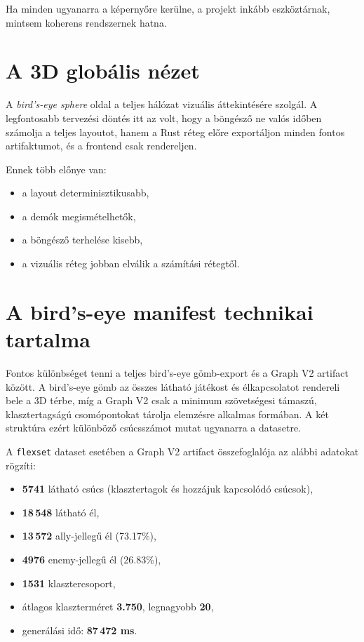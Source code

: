 ﻿\documentclass[a4paper,12pt]{report}
\begin{document}
Ha minden ugyanarra a képernyőre kerülne, a projekt inkább eszköztárnak, mintsem koherens rendszernek hatna.

\section{A 3D globális nézet}

A \emph{bird's-eye sphere} oldal a teljes hálózat vizuális áttekintésére szolgál. A legfontosabb tervezési döntés itt az volt, hogy a böngésző ne valós időben számolja a teljes layoutot, hanem a Rust réteg előre exportáljon minden fontos artifaktumot, és a frontend csak rendereljen.

Ennek több előnye van:

\begin{itemize}
    \item a layout determinisztikusabb,
    \item a demók megismételhetők,
    \item a böngésző terhelése kisebb,
    \item a vizuális réteg jobban elválik a számítási rétegtől.
\end{itemize}

\section{A bird's-eye manifest technikai tartalma}

Fontos különbséget tenni a teljes bird's-eye gömb-export és a Graph V2 artifact között. A bird's-eye gömb az összes látható játékost és élkapcsolatot rendereli bele a 3D térbe, míg a Graph V2 csak a minimum szövetségesi támaszú, klasztertagságú csomópontokat tárolja elemzésre alkalmas formában. A két struktúra ezért különböző csúcsszámot mutat ugyanarra a datasetre.

A \texttt{flexset} dataset esetében a Graph V2 artifact összefoglalója az alábbi adatokat rögzíti:

\begin{itemize}
    \item \textbf{5741} látható csúcs (klasztertagok és hozzájuk kapcsolódó csúcsok),
    \item \textbf{18\,548} látható él,
    \item \textbf{13\,572} ally-jellegű él (73.17\%),
    \item \textbf{4976} enemy-jellegű él (26.83\%),
    \item \textbf{1531} klasztercsoport,
    \item átlagos klaszterméret \textbf{3.750}, legnagyobb \textbf{20},
    \item generálási idő: \textbf{87\,472 ms}.
\end{itemize}
\end{document}

